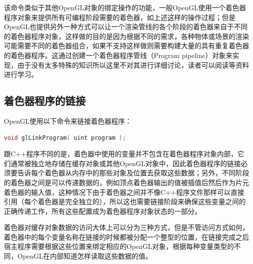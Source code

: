该命令类似于其他OpenGL对象的绑定操作的功能，一般OpenGL使用一个着色器程序对象来提供所有可编程阶段需要的着色器，如上述这样的操作过程；但是OpenGL也提供另外一种方式可以让一个渲染管线的各个阶段的着色器来自于不同的着色器程序对象，这样做的目的是因为根据不同的需求，各种物体或场景的渲染可能需要不同的着色器组合，如果不支持这样做则需要构建大量的具有重复着色器的着色器程序。这通过创建一个着色器程序管线（Program pipeline）对象来实现，由于没有太多特殊的知识所以这里不对其进行详细讨论，读者可以阅读\cite{b:OpenGL4.5CoreProfile}等资料进行学习。





\subsection{着色器程序的链接}
OpenGL使用以下命令来链接着色器程序：

\begin{lstlisting}[language=C++]
void glLinkProgram( uint program );
\end{lstlisting}

跟C++程序不同的是，着色器中使用的变量并不包含在着色器程序对象内部，它们通常被独立地存储在缓存对象或其他OpenGL对象中，因此着色器程序的链接必须要告诉每个着色器从内存中的那些对象及位置去获取这些数据；另外，不同阶段的着色器之间是可以传递数据的，例如顶点着色器输出的值被插值后然后作为片元着色器的输入值，这种情况下由于着色器之间并不像C++程序文件那样可以直接引用（每个着色器是完全独立的），所以这也需要链接阶段来确保这些变量之间的正确传递工作，所有这些配置成为着色器程序对象状态的一部分。

着色器对缓存对象数据的访问大体上可以分为三种方式，但是不管访问方式如何，着色器中的每个变量名称在链接的时候都被分配一个整型的位置，在链接完成之后宿主程序需要根据这些位置来绑定相应的OpenGL对象，根据每种变量类型的不同，OpenGL在内部知道怎样读取这些数据的值。

